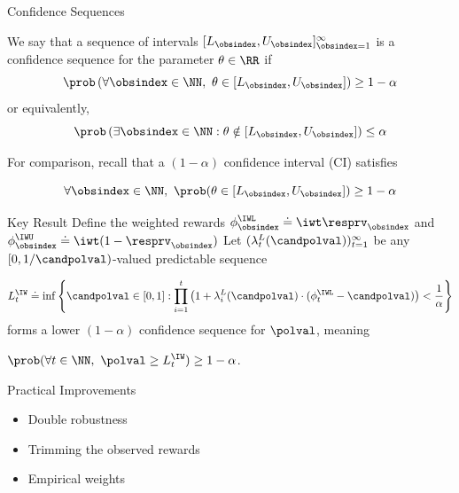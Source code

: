 \documentclass[aspectratio=169, professionalfonts]{beamer}
\begin{document}
\begin{frame}{Confidence Sequences}
	\begin{definition}
		We say that a sequence of intervals $[L_\obsindex, U_\obsindex]_{\obsindex=1}^\infty$ is a confidence sequence for the parameter $\theta \in \RR$ if
		\begin{equation*}\label{eq:cs}
			\prob \left ( \forall \obsindex \in \NN,\ \theta \in [L_\obsindex, U_\obsindex] \right ) \geq 1-\alpha \end{equation*}
		or equivalently,
		\begin{equation*}
			\prob \left ( \exists \obsindex \in \NN : \theta \notin [L_\obsindex, U_\obsindex] \right ) \leq \alpha
		\end{equation*}
	\end{definition}

	\vfill \pause
	For comparison, recall that a $(1- \alpha)$ confidence interval (CI) satisfies

	$$\forall \obsindex \in \NN,\ \prob(\theta \in [L_\obsindex, U_\obsindex]) \geq 1-\alpha$$
\end{frame}

\begin{frame}{Key Result}
	Define the weighted rewards $\phi_\obsindex^\IWL \doteq \iwt \resprv_\obsindex$ and $\phi_\obsindex^\IWU \doteq
		\iwt(1-\resprv_\obsindex)$
	\vfill
	Let   $(\lambda_t^L(\candpolval))_{t=1}^\infty$ be any $[0, 1/\candpolval)$-valued
	predictable sequence

	\vfill
	\begin{equation}\label{eq:kmr-cs}
		L_t^\IW \doteq \inf\left \{ \candpolval \in [0, 1] : \prod_{i=1}^t \left ( 1 + \lambda_i^L(\candpolval) \cdot (\phi_t^\IWL - \candpolval) \right ) < \frac{1}{\alpha} \right \}
	\end{equation}
	forms a lower $(1-\alpha)$ confidence sequence for $\polval$, meaning

	$\prob(\forall t \in \NN,\ \polval \geq L_t^\IW) \geq 1-\alpha$.
\end{frame}

\begin{frame}{Practical Improvements}
	\begin{itemize}
		\item Double robustness
		\item Trimming the observed rewards
		\item Empirical weights
	\end{itemize}
\end{frame}
\end{document}
